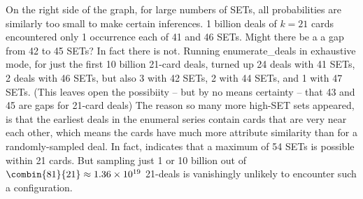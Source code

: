 \documentclass[10pt]{amsart}
\newcommand{\EDb}{{\sc enumerate\_deals }}
\begin{document}
On the right side of the graph, for large numbers of SETs, all probabilities are
similarly too small to make certain inferences. 1 billion deals of $k=21$ cards
encountered only 1 occurrence each of 41 and 46 SETs. Might there be a a gap
from 42 to 45 SETs? In fact there is not. Running \EDb in exhaustive mode, for
just the first 10 billion 21-card deals, turned up 24 deals with 41 SETs, 2
deals with 46 SETs, but also 3 with 42 SETs, 2 with 44 SETs, and 1 with 47
SETs. (This leaves open the possibiity -- but by no means certainty -- that 43
and 45 are gaps for 21-card deals) The reason so many more high-SET sets
appeared, is that the earliest deals in the enumeral series contain cards that
are very near each other, which means the cards have much more attribute
similarity than for a randomly-sampled deal. In fact, \cite{VINCI} indicates
that a maximum of 54 SETs is possible within 21 cards. But sampling just 1 or 10
billion out of $\combin{81}{21}\approx 1.36\times 10^{19}$ 21-deals is
vanishingly unlikely to encounter such a configuration.


\end{document}
